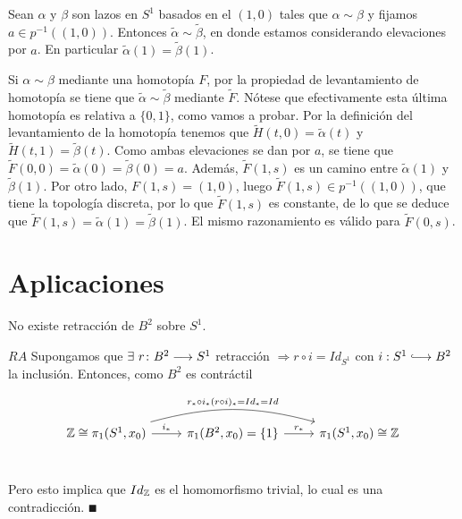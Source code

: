 \documentclass[GTS.tex]{subfiles}
\begin{document}
\begin{coro}
Sean $\alpha$ y $\beta$ son lazos en $S^1$ basados en el $(1,0)$ tales que $\alpha\sim \beta$ y fijamos $a\in p^{-1}((1,0))$. Entonces $\tilde{\alpha}\sim\tilde{\beta}$, en donde estamos considerando elevaciones por $a$. En particular $\tilde{\alpha}(1)=\tilde{\beta}(1)$.
\end{coro}
\begin{dem}
Si $\alpha\sim\beta$ mediante una homotopía $F$, por la propiedad de levantamiento de homotopía se tiene que $\tilde{\alpha}\sim\tilde{\beta}$ mediante $\widetilde{F}$. Nótese que efectivamente esta última homotopía es relativa a $\{0,1\}$, como vamos a probar. Por la definición del levantamiento de la homotopía tenemos que $\widetilde{H}(t,0)=\tilde{\alpha}(t)$ y $\widetilde{H}(t,1)=\tilde{\beta}(t)$. Como ambas elevaciones se dan por $a$, se tiene que $\widetilde{F}(0,0)=\tilde{\alpha}(0)=\tilde{\beta}(0)=a$. Además, $\tilde{F}(1,s)$ es un camino entre $\tilde{\alpha}(1)$ y $\tilde{\beta}(1)$. Por otro lado, $F(1,s)=(1,0)$, luego $\widetilde{F}(1,s)\in p^{-1}((1,0))$, que tiene la topología discreta, por lo que $\widetilde{F}(1,s)$ es constante, de lo que se deduce que $\widetilde{F}(1,s)=\tilde{\alpha}(1)=\tilde{\beta}(1)$. El mismo razonamiento es válido para $\widetilde{F}(0,s)$. 
\end{dem}
\section{Aplicaciones}

\begin{teorema} No existe retracción de $B^2$ sobre $S^1$.
\end{teorema}
\begin{dem}
$\boxed{RA}$ Supongamos que $\exists\ r\func{B^2}{S^1}$ retracción $\Rightarrow r\circ i=Id_{S^1}$ con $i:S^1\longhookarrow B^2$ la inclusión. Entonces, como $B^2$ es contráctil

\[
\begin{tikzcd}
\Z\cong\pi_1(S^1,x_0)\arrow[r, "i_*"]\arrow[rr, "r_*\circ i_*(r\circ i)_*=Id_*=Id", bend right=-15] & \pi_1(B^2,x_0)=\{1\} \arrow[r, "r_*"] & \pi_1(S^1,x_0)\cong\Z \\
\end{tikzcd}
\]

Pero esto implica que $Id_{\mathbb{Z}}$ es el homomorfismo trivial, lo cual es una contradicción. $\QED$
\end{dem}
\end{document}
